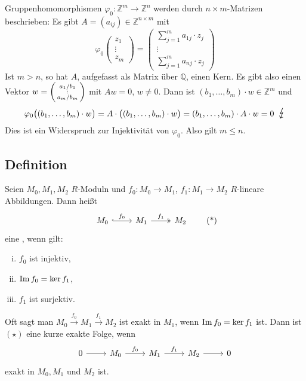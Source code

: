 Gruppenhomomorphismen $\varphi_0 \colon \mathds{Z}^m \to \mathds{Z}^n$ werden durch $n \times m$-Matrizen beschrieben: Es gibt $A= (a_{ij}) \in \mathds{Z}^{n \times m}$ mit
\[
	\varphi_0 \begin{pmatrix}
		z_1 \\ \vdots \\ z_m
	\end{pmatrix} = \begin{pmatrix}
		\sum_{j=1}^{m} a_{1j} \cdot z_j \\
		\vdots \\
		\sum_{j=1}^{m} a_{nj} \cdot z_j
	\end{pmatrix}
\]
Ist $m >n$, so hat $A$, aufgefasst als Matrix über $\mathds{Q}$, einen Kern. Es gibt also einen Vektor $w = \begin{psmallmatrix}a_1/b_1 \\ : \\ a_m/b_m\end{psmallmatrix}$
mit $A w = 0$, $w \not=0$. Dann ist $(b_1, \ldots , b_m) \cdot w \in \mathds{Z}^m$ und 
\[
	\varphi_0 \enbrace[\big]{(b_1, \ldots , b_m)\cdot w} = A \cdot \enbrace[\big]{(b_1, \ldots , b_m) \cdot w} = (b_1, \ldots , b_m) \cdot A \cdot w = 0 \enspace\light
\]
Dies ist ein Widerspruch zur Injektivität von $\varphi_0$. Also gilt $m \le n$. \bewende

\subsection[Definition: Kurze exakte Sequenz]{Definition} %
\label{sub:43}
Seien $M_0, M_1, M_2$ $R$-Moduln und $f_0 \colon M_0 \to M_1$, $f_1 \colon M_1 \to M_2$ $R$-lineare Abbildungen. Dann heißt 
\begin{equation*}
	\begin{tikzcd}
		M_0 \rar["f_0", hook] & M_1 \rar["f_1", two heads]& M_2 
	\end{tikzcd} \label{eq:43} \tag{*}
\end{equation*}
eine , wenn gilt:
\begin{multicols}{3}
	\begin{enumerate}[(i)]
		\item $f_0$ ist injektiv,
		\item $\im f_0 = \ker f_1$,
		\item $f_1$ ist surjektiv.
	\end{enumerate}
\end{multicols}
Oft sagt man $M_0 \xrightarrow{f_0} M_1 \xrightarrow{f_1} M_2$ ist exakt in $M_1$, wenn $\im f_0 = \ker f_1$ ist. Dann ist $(\star)$ eine kurze exakte Folge, wenn
\[
	\begin{tikzcd}
		0 \rar & M_0 \rar["f_0"] & M_1 \rar["f_1"]& M_2 \rar & 0
	\end{tikzcd}
\]
exakt in $M_0, M_1$ und $M_2$ ist.


